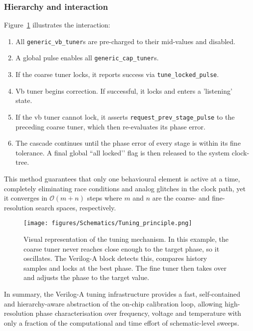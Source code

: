 \subsubsection{Hierarchy and interaction}
Figure~\ref{fig:tuning_hierarchy} illustrates the interaction:

\begin{enumerate}
  \item All \texttt{generic\_vb\_tuner}s are pre-charged to their
        mid-values and disabled.
  \item A global pulse enables all \texttt{generic\_cap\_tuner}s.
  \item If the coarse tuner locks, it reports success via \texttt{tune\_locked\_pulse}.
  \item Vb tuner begins correction. If successful, it locks and enters a 'listening' state.
  \item If the vb tuner cannot lock, it asserts \texttt{request\_prev\_stage\_pulse} to
        the preceding coarse tuner, which then re-evaluates its phase error.
  \item The cascade continues until the phase error of every stage is within its
        fine tolerance. A final global ``all locked’’ flag is then released to the
        system clock-tree.
\end{enumerate}

This method guarantees that only one behavioural element is active at a
time, completely eliminating race conditions and analog
 glitches in the clock
path, yet it converges in $\mathcal{O}(m+n)$ steps where
\(m\) and \(n\) are the coarse- and fine-resolution search spaces, respectively.

\begin{figure}[h]
  \centering
  \texttt{[image: figures/Schematics/Tuning\_principle.png]}
  \caption{Visual representation of the tuning mechanism. In this example, the coarse tuner never reaches close enough to the target phase, so it oscillates. The Verilog-A block detects this, compares history samples and locks at the best phase. The fine tuner then takes over and adjusts the phase to the target value.}
  \label{fig:tuning_hierarchy}
\end{figure}


\vspace{1em}
In summary, the Verilog-A tuning infrastructure provides a fast,
self-contained and hierarchy-aware abstraction of the on-chip calibration loop,
allowing high-resolution phase characterisation over frequency, voltage and
temperature with only a fraction of the computational and time effort of schematic-level
sweeps.


